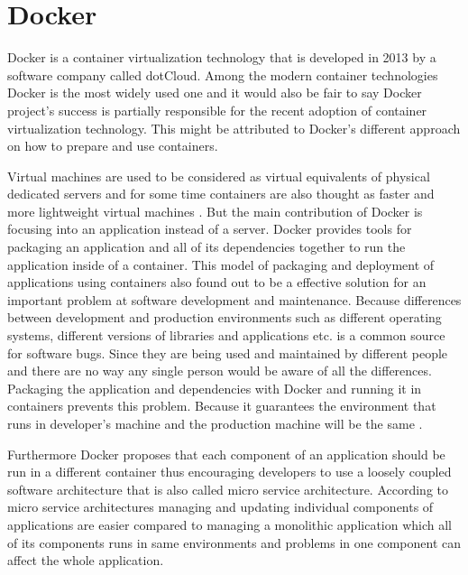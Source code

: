 \documentclass[12pt,oneandhalf,chaparabic,ceng,ms,eng,oneside,pntc]{gsufbe}
\begin{document}
\section{Docker}
Docker is a container virtualization technology \cite{docker} that is developed in 2013 by a software
company called
dotCloud.  Among the modern container technologies Docker is the most widely used one and it would also
be fair to say Docker project's success is partially responsible for the recent adoption of container
virtualization technology.  This might be attributed to Docker's different approach on how to prepare 
and use containers.

Virtual machines are used to be considered as virtual equivalents of physical dedicated servers and for
some time containers are also thought as faster and more lightweight virtual machines
\cite{adufu_is_2015}.  But the main
contribution of Docker is focusing into an application instead of a server.  Docker provides tools for
packaging an application and all of its dependencies together to run the application inside of a
container.  This model of packaging and deployment of applications using containers also found out to be
a effective solution for an important problem at software development and maintenance.  Because 
differences between development and production environments such as different operating systems, 
different versions of libraries and applications etc. is a common source for software bugs.  Since they
are being used and  maintained by different people and there are no way any single person would be
aware of all the differences.  Packaging the application and dependencies with Docker and running it in
containers prevents this problem.  Because it guarantees the environment that runs in developer’s
machine and the production machine will be the same \cite{boettiger_introduction_2015}.

Furthermore Docker proposes that each component of an application should be run in a 
different container thus encouraging developers to use a loosely coupled software architecture that is 
also called micro service architecture.  According to micro service architectures managing and updating
individual components of applications are easier compared to managing a monolithic application which
all of its components runs in same environments and problems in one component can affect the whole
application.
\end{document}

